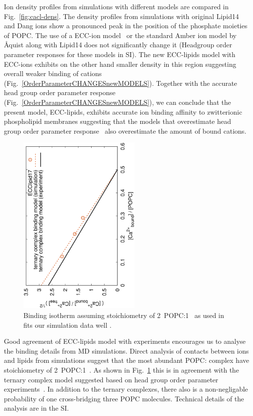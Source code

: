 \documentclass[aip,jcp,twocolumn]{revtex4}
\begin{document}
Ion density profiles from simulations with different models are compared in Fig.~\ref{fig:cacl-dens}.
The density profiles from simulations with original Lipid14 \cite{dickson14} and Dang ions \cite{smith94,chang1999,dang2006} 
show a pronounced peak in the position of the phosphate moieties of POPC. 
The use of a ECC-ion model~\cite{kohagen14,kohagen16} 
or the standard Amber ion model by \AA{quist} 
along with Lipid14 does not significantly change it 
(Headgroup order parameter responses for these models in SI).
The new ECC-lipids model with ECC-ions exhibits on the other hand smaller density in this region 
suggesting overall weaker binding of cations (Fig.~\ref{OrderParameterCHANGESnewMODELS}). 
Together with the accurate head group order parameter response (Fig.~\ref{OrderParameterCHANGESnewMODELS}),
we can conclude that the present model, ECC-lipids, exhibits accurate ion binding affinity to zwitterionic phospholipid membranes
suggesting that the models that overestimate head group order parameter response~\cite{catte16} also overestimate the amount of bound cations.


\begin{figure}[]
  \centering
  \includegraphics[height=9.0cm,angle=-90]{../Fig/bound-CAs_conc-eccl17.eps}
  \caption{\label{fig:cacl-bind}
    Binding isotherm assuming stoichiometry of 2~POPC:1~ as used in \cite{altenbach84} fits our simulation data well .}
\end{figure}


Good agreement of ECC-lipids model with experiments encourages us to analyse the
binding details from MD simulations. Direct analysis of contacts between ions and
lipids from simulations suggest that the most abundant POPC: complex 
have stoichiometry of 2~POPC:1~.
As shown in Fig.~\ref{fig:cacl-bind} this is in agreement
with the ternary complex model suggested based on head group order parameter
experiments~\cite{altenbach84}.
In addition to the ternary complexes, there also is a non-negligable probability
of one  cross-bridging three POPC molecules.
Technical details of the analysis are in the SI. 
\end{document}
